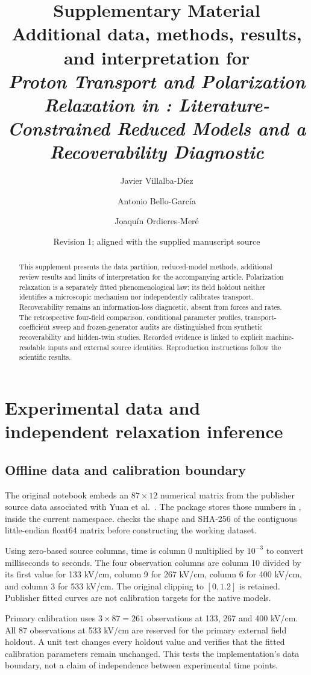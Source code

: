 \documentclass[11pt,a4paper]{article}
\title{Supplementary Material\\[5pt]\large Additional data, methods, results, and interpretation for\\[4pt]
\textit{Proton Transport and Polarization Relaxation in \material: Literature-Constrained Reduced Models and a Recoverability Diagnostic}}
\author{Javier Villalba-D\'iez \and Antonio Bello-Garc\'ia \and Joaqu\'in Ordieres-Mer\'e}
\date{Revision 1; aligned with the supplied manuscript source}
\newcommand{\code}[1]{\texttt{\detokenize{#1}}}
\newcommand{\repo}[1]{\path{#1}}
\begin{document}
\maketitle
\begin{abstract}
This supplement presents the data partition, reduced-model methods, additional review results and limits of interpretation for the accompanying article. Polarization relaxation is a separately fitted phenomenological law; its field holdout neither identifies a microscopic mechanism nor independently calibrates transport. Recoverability remains an information-loss diagnostic, absent from forces and rates. The retrospective four-field comparison, conditional parameter profiles, transport-coefficient sweep and frozen-generator audits are distinguished from synthetic recoverability and hidden-twin studies. Recorded evidence is linked to explicit machine-readable inputs and external source identities. Reproduction instructions follow the scientific results.
\end{abstract}
\tableofcontents
\clearpage

\section{Experimental data and independent relaxation inference}\label{sec:inference}

\subsection{Offline data and calibration boundary}

The original notebook embeds an $87\times12$ numerical matrix from the publisher source data associated with Yuan et al.~\cite{yuan}. The package stores those numbers in \repo{data/fig2h.json}, inside the current namespace. \code{PolarizationDataset.load} checks the shape and SHA-256 of the contiguous little-endian float64 matrix before constructing the working dataset.

Using zero-based source columns, time is column 0 multiplied by $10^{-3}$ to convert milliseconds to seconds. The four observation columns are column 10 divided by its first value for 133 kV/cm, column 9 for 267 kV/cm, column 6 for 400 kV/cm, and column 3 for 533 kV/cm. The original clipping to $[0,1.2]$ is retained. Publisher fitted curves are not calibration targets for the native models.

Primary calibration uses $3\times87=261$ observations at 133, 267 and 400 kV/cm. All 87 observations at 533 kV/cm are reserved for the primary external field holdout. A unit test changes every holdout value and verifies that the fitted calibration parameters remain unchanged. This tests the implementation's data boundary, not a claim of independence between experimental time points.
\end{document}
